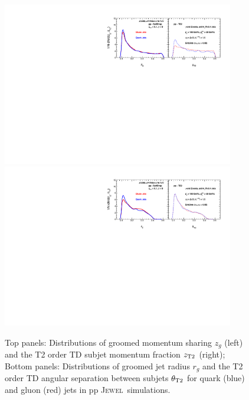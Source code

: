 \documentclass[notoc,preprintnumbers]{JHEP3}
\newcommand{\jw}{\textsc{Jewel}~}
\begin{document}
\begin{figure}[t]
	   \centering
	   \includegraphics[width=0.9\textwidth]{plots/Comp_zg_ppcomp_SD_TD2_new.pdf}
	   \includegraphics[width=0.9\textwidth]{plots/Comp_rg_ppcomp_SD_TD2_new.pdf}
	   \caption{Top panels: Distributions of groomed momentum sharing $z_g$ (left) and the T2 order TD subjet momentum fraction $z_{\rm T2}$ (right); Bottom panels: Distributions of groomed jet radius $r_g$ and the T2 order TD angular separation between subjets $\theta_{\rm T2}$ for quark (blue) and gluon (red) jets in pp \jw simulations.}
\label{fig:comp_z_pp_wT2}
\end{figure}
\end{document}

